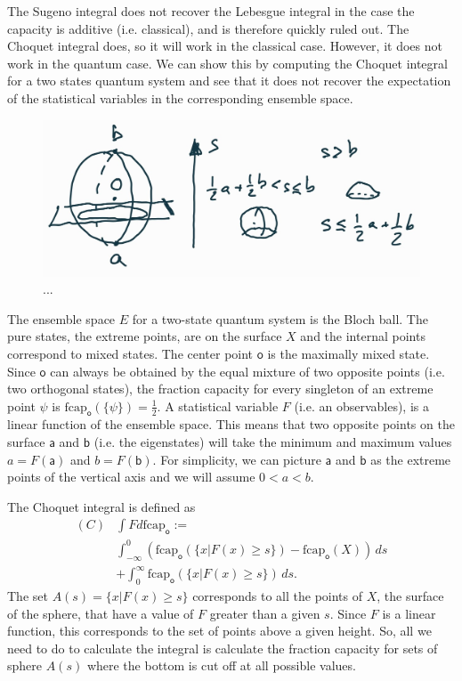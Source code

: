 \documentclass[10pt,twocolumn, nofootinbib]{revtex4-2}
\newcommand\frcap{\mathrm{fcap}}
\newcommand{\ens}[1][e] {\mathsf{#1}} %
\begin{document}
The Sugeno integral does not recover the Lebesgue integral in the case the capacity is additive (i.e. classical), and is therefore quickly ruled out. The Choquet integral does, so it will work in the classical case. However, it does not work in the quantum case. We can show this by computing the Choquet integral for a two states quantum system and see that it does not recover the expectation of the statistical variables in the corresponding ensemble space.

\begin{figure}[H]
	\centering
	\includegraphics[width=0.8\columnwidth]{ChoquetCalculation1.jpg}
	\caption{...}
\end{figure}

The ensemble space $E$ for a two-state quantum system is the Bloch ball. The pure states, the extreme points, are on the surface $X$ and the internal points correspond to mixed states. The center point $\ens[o]$ is the maximally mixed state. Since $\ens[o]$ can always be obtained by the equal mixture of two opposite points (i.e. two orthogonal states), the fraction capacity for every singleton of an extreme point $\psi$ is $\frcap_{\ens[o]}(\{\psi\}) =\frac{1}{2}$. A statistical variable $F$ (i.e. an observables), is a linear function of the ensemble space. This means that two opposite points on the surface $\ens[a]$ and $\ens[b]$ (i.e. the eigenstates) will take the minimum and maximum values $a = F(\ens[a])$ and $b = F(\ens[b])$. For simplicity, we can picture $\ens[a]$ and $\ens[b]$ as the extreme points of the vertical axis and we will assume $0<a<b$.

The Choquet integral is defined as 
\begin{equation}
	\begin{aligned}
(C)&\int F d\frcap_{\ens[o]} := \\
&\int_{-\infty}^0
(\frcap_{\ens[o]} (\{x | F (x) \geq s\})-\frcap_{\ens[o]}(X))\, ds \\
&+
\int^\infty_0
\frcap_{\ens[o]} (\{x | F (x) \geq s\})\, ds.
	\end{aligned}
\end{equation}
The set $A(s) = \{x | F (x) \geq s\}$ corresponds to all the points of $X$, the surface of the sphere, that have a value of $F$ greater than a given $s$. Since $F$ is a linear function, this corresponds to the set of points above a given height. So, all we need to do to calculate the integral is calculate the fraction capacity for sets of sphere $A(s)$ where the bottom is cut off at all possible values.
\end{document}
